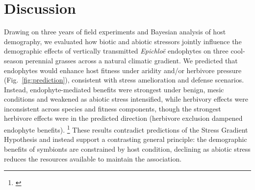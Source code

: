 \documentclass[12pt]{article}\usepackage[]{graphicx}\usepackage[dvipsnames]{xcolor}
\newcommand{\tom}[2]{{\color{red}{#1}}\footnote{\textit{\color{red}{#2}}}}
\begin{document}
\section*{Discussion}
Drawing on three years of field experiments and Bayesian analysis of host demography, we evaluated how biotic and abiotic stressors jointly influence the demographic effects of vertically 
transmitted \textit{Epichloë} endophytes on three cool-season perennial grasses across a natural climatic gradient. 
We predicted that endophytes would enhance host fitness under aridity and/or herbivore pressure (Fig.~\ref{fig:prediction}), consistent with stress amelioration and defense scenarios. 
Instead, endophyte-mediated benefits were strongest under benign, mesic conditions and weakened as abiotic stress intensified, while herbivory effects were inconsistent across species and fitness components, though the strongest herbivore effects were in the predicted direction (herbivore exclusion dampened endophyte benefits). 
\tom{}{I commented out a sentence here about growth being `invariant' because I thought it was not supported by the data.}
These results contradict predictions of the Stress Gradient Hypothesis and instead support a contrasting general principle: the demographic benefits of symbionts are constrained by host condition, declining as abiotic stress reduces the resources available to maintain the association.
\end{document}

